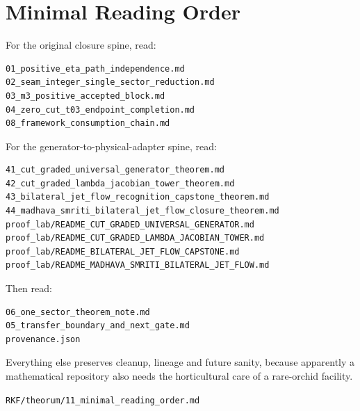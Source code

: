 \hypertarget{minimal-reading-order}{%
\chapter{Minimal Reading Order}\label{minimal-reading-order}}

For the original closure spine, read:

\begin{verbatim}
01_positive_eta_path_independence.md
02_seam_integer_single_sector_reduction.md
03_m3_positive_accepted_block.md
04_zero_cut_t03_endpoint_completion.md
08_framework_consumption_chain.md
\end{verbatim}

For the generator-to-physical-adapter spine, read:

\begin{verbatim}
41_cut_graded_universal_generator_theorem.md
42_cut_graded_lambda_jacobian_tower_theorem.md
43_bilateral_jet_flow_recognition_capstone_theorem.md
44_madhava_smriti_bilateral_jet_flow_closure_theorem.md
proof_lab/README_CUT_GRADED_UNIVERSAL_GENERATOR.md
proof_lab/README_CUT_GRADED_LAMBDA_JACOBIAN_TOWER.md
proof_lab/README_BILATERAL_JET_FLOW_CAPSTONE.md
proof_lab/README_MADHAVA_SMRITI_BILATERAL_JET_FLOW.md
\end{verbatim}

Then read:

\begin{verbatim}
06_one_sector_theorem_note.md
05_transfer_boundary_and_next_gate.md
provenance.json
\end{verbatim}

Everything else preserves cleanup, lineage and future sanity, because apparently
a mathematical repository also needs the horticultural care of a rare-orchid
facility.

\begin{flushright}\small\texttt{RKF/theorum/11\_minimal\_reading\_order.md}\end{flushright}

